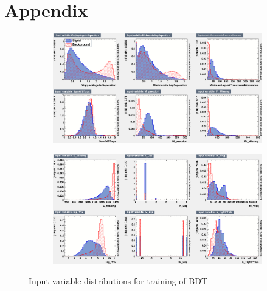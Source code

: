\section{Appendix}



\begin{figure}[h]
  \centering
  \captionsetup[subfigure]{labelformat=empty}
  \begin{subfigure}[b]{1.0\textwidth}
    \includegraphics[width=1\linewidth]{figures/variables1}
    \caption{}
    \label{1} 
  \end{subfigure}
  \begin{subfigure}[b]{1.0\textwidth}
    \includegraphics[width=1\linewidth]{figures/variables2}
    \caption{}
    \label{2}
  \end{subfigure}
    \caption{Input variable distributions for training of BDT}
\end{figure}

